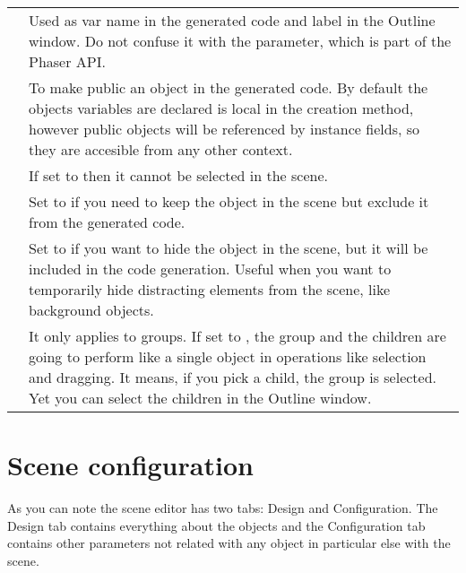\documentclass[letterpaper,10pt,english]{sphinxmanual}
\begin{document}
\begin{savenotes}\sphinxattablestart
\centering
\begin{tabulary}{\linewidth}[t]{|T|T|}
\hline
{}\relax &\relax \\
\hline
{}
&
Used as var name in the generated code and label in the Outline window. Do not confuse it with the  parameter, which is part of the Phaser API.
\\
\hline
{}
&
To make public an object in the generated code. By default the objects variables are declared is local in the creation method, however public objects will be referenced by instance fields, so they are accesible from any other context.
\\
\hline
{}
&
If set to  then it cannot be selected in the scene.
\\
\hline
{}
&
Set to  if you need to keep the object in the scene but exclude it from the generated code.
\\
\hline
{}
&
Set to  if you want to hide the object in the scene, but it will be included in the code generation. Useful when you want to temporarily hide distracting elements from the scene, like background objects.
\\
\hline
{}
&
It only applies to groups. If set to , the group and the children are going to perform like a single object in operations like selection and dragging. It means, if you pick a child, the group is selected. Yet you can select the children in the Outline window.
\\
\hline
\end{tabulary}
\par
\sphinxattableend\end{savenotes}


\section{Scene configuration}
\label{\detokenize{canvas:scene-configuration}}
As you can note the scene editor has two tabs: Design and Configuration. The Design tab contains everything about the objects and the Configuration tab contains other parameters not related with any object in particular else with the scene.
\end{document}
